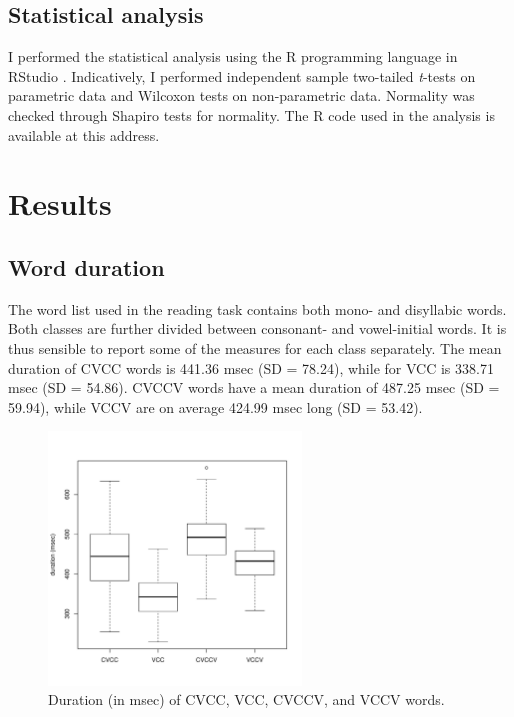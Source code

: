 \documentclass[11pt,a4paper,openany]{memoir}\usepackage[]{graphicx}\usepackage[]{color}
\newenvironment{knitrout}{}{} %
\begin{document}
\section{Statistical analysis}
\label{s:stats}
I performed the statistical analysis using the R programming language \citep{r-core-team2015} in RStudio \citep{rstudio-team2015}.
Indicatively, I performed independent sample two-tailed \textit{t}-tests on parametric data and Wilcoxon tests on non-parametric data.
Normality was checked through Shapiro tests for normality.
The R code used in the analysis is available at this address.













\chapter{Results}
\label{c:results}

\section{Word duration}

The word list used in the reading task contains both mono- and disyllabic words.
Both classes are further divided between consonant- and vowel-initial words.
It is thus sensible to report some of the measures for each class separately.
The mean duration of CVCC words is 441.36 msec (SD = 78.24), while for VCC is 338.71 msec (SD = 54.86).
CVCCV words have a mean duration of 487.25 msec (SD = 59.94), while VCCV are on average 424.99 msec long (SD = 53.42).

\begin{figure}
\centering
\begin{knitrout}
\color{fgcolor}
\includegraphics[width=0.6\textwidth]{img/word-duration-1} 

\end{knitrout}
\caption{Duration (in msec) of CVCC, VCC, CVCCV, and VCCV words.}
\label{f:worddur}
\end{figure}
\end{document}
